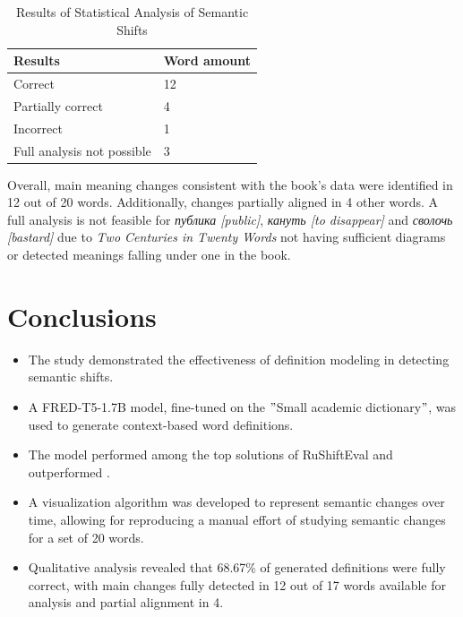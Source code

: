 \documentclass[a0,portrait]{a0poster}
\begin{document}
\begin{multicols}{2}
\begin{table}[H]
\centering
\label{tab:Statistical}
\begin{tabular}{|m{9cm}|m{6cm}|}
\hline
\textbf{Results} & \textbf{Word amount} \\
\hline
Correct & 12 \\
\hline
Partially correct & 4 \\
\hline
Incorrect & 1 \\
\hline
Full analysis not possible & 3 \\
\hline
\end{tabular}
\caption{Results of Statistical Analysis of Semantic Shifts}
\end{table}

Overall, main meaning changes consistent with the book's data were identified in 12 out of 20 words.
Additionally, changes partially aligned in 4 other words.
A full analysis is not feasible for \textit{публика [public]}, \textit{кануть [to disappear]} and \textit{сволочь [bastard]}
due to \textit{Two Centuries in Twenty Words} not having sufficient diagrams or detected meanings falling under one in the book.


\color{SaddleBrown} %

\section*{Conclusions}

\begin{itemize}
    \item The study demonstrated the effectiveness of definition modeling in detecting semantic shifts.%
    \item A FRED-T5-1.7B model, fine-tuned on the \("\)Small academic dictionary\("\), was used to generate context-based word definitions.
    \item The model performed among the top solutions of RuShiftEval and outperformed .
    \item A visualization algorithm was developed to represent semantic changes over time, allowing for reproducing a manual effort of studying semantic changes for a set of 20 words.
    \item Qualitative analysis revealed that 68.67\% of generated definitions were fully correct, with main changes fully detected in 12 out of 17 words available for analysis and partial alignment in 4.
\end{itemize}


\end{multicols}
\end{document}
